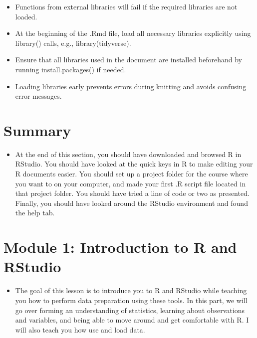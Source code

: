 \documentclass[
  letterpaper,
  DIV=11,
  numbers=noendperiod]{scrreprt}
\providecommand{\tightlist}{%
  \setlength{\itemsep}{0pt}\setlength{\parskip}{0pt}}\usepackage{longtable,booktabs,array}
\begin{document}
\begin{itemize}
  \begin{itemize}
  \tightlist
  \item
    Functions from external libraries will fail if the required
    libraries are not loaded.
  \item
    At the beginning of the .Rmd file, load all necessary libraries
    explicitly using library() calls, e.g., library(tidyverse).
  \item
    Ensure that all libraries used in the document are installed
    beforehand by running install.packages() if needed.
  \item
    Loading libraries early prevents errors during knitting and avoids
    confusing error messages.
  \end{itemize}
\end{itemize}


\chapter{Summary}\label{summary}

\begin{itemize}
\tightlist
\item
  At the end of this section, you should have downloaded and browsed R
  in RStudio. You should have looked at the quick keys in R to make
  editing your R documents easier. You should set up a project folder
  for the course where you want to on your computer, and made your first
  .R script file located in that project folder. You should have tried a
  line of code or two as presented. Finally, you should have looked
  around the RStudio environment and found the help tab.
\end{itemize}


\chapter{Module 1: Introduction to R and
RStudio}\label{module-1-introduction-to-r-and-rstudio}

\begin{itemize}
\tightlist
\item
  The goal of this lesson is to introduce you to R and RStudio while
  teaching you how to perform data preparation using these tools. In
  this part, we will go over forming an understanding of statistics,
  learning about observations and variables, and being able to move
  around and get comfortable with R. I will also teach you how use and
  load data.
\end{itemize}
\end{document}
